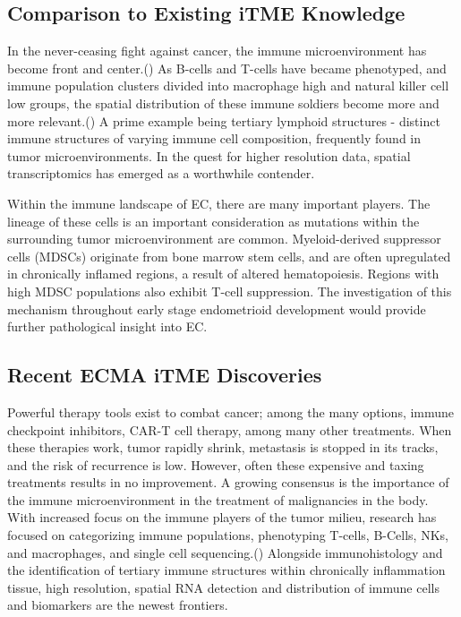 \documentclass[Endo]{subfiles}
\begin{document}
\subsection{Comparison to Existing iTME Knowledge}\label{subsec:lit}
\hypertarget{DiffFromLit}{}In the never-ceasing fight against cancer, the immune microenvironment has become front and center.(\cite{Meyer:2020}) As B-cells and T-cells have became phenotyped, and immune population clusters divided into macrophage high and natural killer cell low groups, the spatial distribution of these immune soldiers become more and more relevant.(\cite{Van:2022}) A prime example being tertiary lymphoid structures - distinct immune structures of varying immune cell composition, frequently found in tumor microenvironments. In the quest for higher resolution data, spatial transcriptomics has emerged as a worthwhile contender.

Within the immune landscape of EC, there are many important players. The lineage of these cells is an important consideration as mutations within the surrounding tumor microenvironment are common. Myeloid-derived suppressor cells (MDSCs) originate from bone marrow stem cells, and are often upregulated in chronically inflamed regions, a result of altered hematopoiesis. Regions with high MDSC populations also exhibit T-cell suppression.  The investigation of this mechanism throughout early stage endometrioid development would provide further pathological insight into EC. 

 
\hypertarget{Recent-ECMA-iTME-Discoveries}{}
\subsection{Recent ECMA iTME Discoveries}\label{subsec:recent}

Powerful therapy tools exist to combat cancer; among the many options, immune checkpoint inhibitors, CAR-T cell therapy, among many other treatments. When these therapies work, tumor rapidly shrink, metastasis is stopped in its tracks, and the risk of recurrence is low. However, often these expensive and taxing treatments results in no improvement. A growing consensus is the importance of the immune microenvironment in the treatment of malignancies in the body. With increased focus on the immune players of the tumor milieu, research has focused on categorizing immune populations, phenotyping T-cells, B-Cells, NKs, and macrophages, and single cell sequencing.(\cite{Yama:2013}) Alongside immunohistology and the identification of tertiary immune structures within chronically inflammation tissue, high resolution, spatial RNA detection and distribution of immune cells and biomarkers are the newest frontiers.
\end{document}
